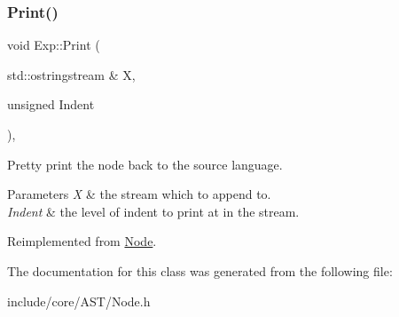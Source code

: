 \subsubsection{\texorpdfstring{Print()}{Print()}}
{\footnotesize\ttfamily void Exp\+::\+Print (\begin{DoxyParamCaption}\item[{std\+::ostringstream \&}]{X,  }\item[{unsigned}]{Indent }\end{DoxyParamCaption})\hspace{0.3cm}{\ttfamily [override]}, {\ttfamily [virtual]}}

Pretty print the node back to the source language. 
\begin{DoxyParams}{Parameters}
{\em X} & the stream which to append to. \\
\hline
{\em Indent} & the level of indent to print at in the stream. \\
\hline
\end{DoxyParams}


Reimplemented from \mbox{\hyperlink{class_node_a5325b760a6e6fe94227c0cff53af2c45}{Node}}.



The documentation for this class was generated from the following file\+:\begin{DoxyCompactItemize}
\item 
include/core/\+A\+S\+T/Node.\+h\end{DoxyCompactItemize}
